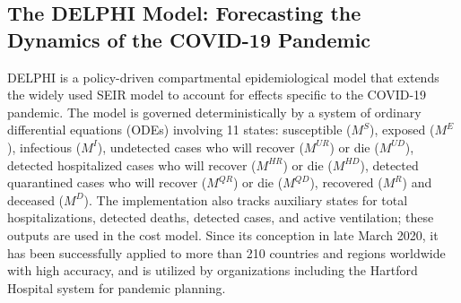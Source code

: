 \documentclass[msom,blindrev]{informs3} %
\begin{document}
\subsection{The DELPHI Model: Forecasting the Dynamics of the COVID-19 Pandemic}
\label{subsec:delphi}
DELPHI is a policy-driven compartmental epidemiological model that extends the widely used SEIR model to account for effects specific to the COVID-19 pandemic.  The model is governed deterministically by a system of ordinary differential equations (ODEs) involving 11 states: susceptible ($M^S$), exposed ($M^E$), infectious ($M^I$), undetected cases who will recover ($M^{UR}$) or die ($M^{UD}$), detected hospitalized cases who will recover ($M^{HR}$) or die ($M^{HD}$), detected quarantined cases who will recover ($M^{QR}$) or die ($M^{QD}$), recovered ($M^{R}$) and deceased ($M^{D}$). The implementation also tracks auxiliary states for total hospitalizations, detected deaths, detected cases, and active ventilation; these outputs are used in the cost model. Since its conception in late March 2020, it has been successfully applied to more than 210 countries and regions worldwide with high accuracy, and is utilized by organizations including the Hartford Hospital system for pandemic planning. 
\end{document}
